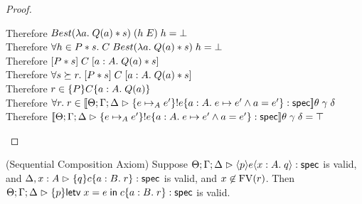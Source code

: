 \begin{proof}
\begin{tabbedproof}
    \oooooo Therefore $Best(\semfun{a}{Q(a)*s})\;(h\;E)\;h = \bot$ \\
    \ooooo Therefore $\forall h \in P*s.\; C\;Best(\semfun{a}{Q(a)*s})\;h = \bot$ \\
    \ooooo Therefore $\basicspec{P*s}{C}{a:A}{Q(a)*s}$ \\
    \oooo Therefore $\forall s \succeq r.\; \basicspec{P*s}{C}{a:A}{Q(a)*s}$ \\
    \oooo Therefore $r \in \spec{P}{C}{a:A}{Q(a)}$ \\
    \ooo Therefore $\forall r.\; r \in \interp{\judgeS{\spec{e \pointsto_A e'}{!e}{a:A}{e \pointsto e' \land a = e'}}}\theta\;\gamma\;\delta$ \\
    \ooo Therefore $\interp{\judgeS{\spec{e \pointsto_A e'}{!e}{a:A}{e \pointsto e' \land a = e'}}}\theta\;\gamma\;\delta = \top$ \\
  \end{tabbedproof}
\end{proof}

\begin{lemma}{(Sequential Composition Axiom)}
Suppose $\judgeS{\mspec{p}{e}{x:A}{q}}$ is valid, and $\judgeS[\Delta,x:A]{\spec{q}{c}{a:B}{r}}$ is valid, and $x \not\in \FV{r}$. Then $\judgeS{\spec{p}{\letv{x}{e}{c}}{a:B}{r}}$ is valid. 
\end{lemma}

